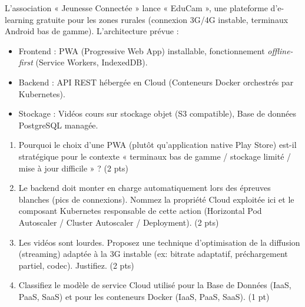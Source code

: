 \documentclass[11pt]{article}
\begin{document}
\begin{exercice}
L'association « Jeunesse Connectée » lance « EduCam », une plateforme d'e-learning gratuite pour les zones rurales (connexion 3G/4G instable, terminaux Android bas de gamme). L'architecture prévue :
\begin{itemize}
    \item Frontend : PWA (Progressive Web App) installable, fonctionnement \textit{offline-first} (Service Workers, IndexedDB).
    \item Backend : API REST hébergée en Cloud (Conteneurs Docker orchestrés par Kubernetes).
    \item Stockage : Vidéos cours sur stockage objet (S3 compatible), Base de données PostgreSQL managée.
\end{itemize}
\begin{enumerate}
    \item Pourquoi le choix d'une PWA (plutôt qu'application native Play Store) est-il stratégique pour le contexte « terminaux bas de gamme / stockage limité / mise à jour difficile » ? \hfill (2 pts)
    \item Le backend doit monter en charge automatiquement lors des épreuves blanches (pics de connexions). Nommez la propriété Cloud exploitée ici et le composant Kubernetes responsable de cette action (Horizontal Pod Autoscaler / Cluster Autoscaler / Deployment). \hfill (2 pts)
    \item Les vidéos sont lourdes. Proposez une technique d'optimisation de la diffusion (streaming) adaptée à la 3G instable (ex: bitrate adaptatif, préchargement partiel, codec). Justifiez. \hfill (2 pts)
    \item Classifiez le modèle de service Cloud utilisé pour la Base de Données (IaaS, PaaS, SaaS) et pour les conteneurs Docker (IaaS, PaaS, SaaS). \hfill (1 pt)
\end{enumerate}
\end{exercice}
\end{document}
